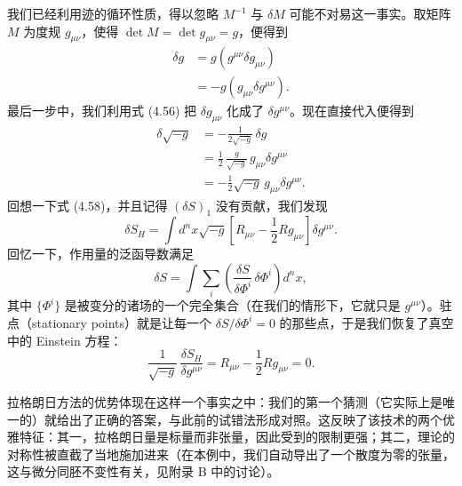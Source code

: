 我们已经利用迹的循环性质，得以忽略 $M^{-1}$ 与 $\delta M$ 可能不对易这一事实。取矩阵 $M$ 为度规 $g_{\mu\nu}$，使得 $\det M=\det g_{\mu\nu}=g$，便得到
\begin{align*}
\delta g &= g\left(g^{\mu\nu}\delta g_{\mu\nu}\right)\\
&= -g\left(g_{\mu\nu}\delta g^{\mu\nu}\right). \tag{4.68}
\end{align*}
最后一步中，我们利用式 (4.56) 把 $\delta g_{\mu\nu}$ 化成了 $\delta g^{\mu\nu}$。现在直接代入便得到
\begin{align*}
\delta\sqrt{-g} &= -\frac{1}{2\sqrt{-g}}\,\delta g\\
&= \frac{1}{2}\,\frac{g}{\sqrt{-g}}\,g_{\mu\nu}\delta g^{\mu\nu}\\
&= -\frac{1}{2}\sqrt{-g}\,g_{\mu\nu}\delta g^{\mu\nu}. \tag{4.69}
\end{align*}
回想一下式 (4.58)，并且记得 $(\delta S)_1$ 没有贡献，我们发现
\begin{equation*}
\delta S_H = \int d^nx\sqrt{-g}\left[R_{\mu\nu}-\frac{1}{2}Rg_{\mu\nu}\right]\delta g^{\mu\nu}.
\tag{4.70}
\end{equation*}
回忆一下，作用量的泛函导数满足
\begin{equation*}
\delta S = \int\sum_i\left(\frac{\delta S}{\delta\Phi^i}\,\delta\Phi^i\right)d^nx,
\tag{4.71}
\end{equation*}
其中 $\{\Phi^i\}$ 是被变分的诸场的一个完全集合（在我们的情形下，它就只是 $g^{\mu\nu}$）。驻点（stationary points）就是让每一个 $\delta S/\delta\Phi^i=0$ 的那些点，于是我们恢复了真空中的 Einstein 方程：
\begin{equation*}
\frac{1}{\sqrt{-g}}\,\frac{\delta S_H}{\delta g^{\mu\nu}} = R_{\mu\nu}-\frac{1}{2}Rg_{\mu\nu} = 0.
\tag{4.72}
\end{equation*}

拉格朗日方法的优势体现在这样一个事实之中：我们的第一个猜测（它实际上是唯一的）就给出了正确的答案，与此前的试错法形成对照。这反映了该技术的两个优雅特征：其一，拉格朗日量是标量而非张量，因此受到的限制更强；其二，理论的对称性被直截了当地施加进来（在本例中，我们自动导出了一个散度为零的张量，这与微分同胚不变性有关，见附录 B 中的讨论）。

